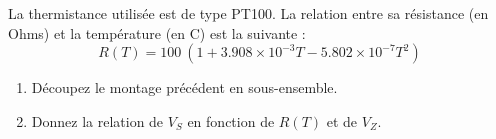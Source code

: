 La thermistance utilisée est de type PT100. La relation entre sa résistance (en Ohms) et la température (en \degre{}C) est la suivante :
$$R(T) = 100~(1 + 3.908×10^{-3} T - 5.802×10^{-7} T^2)$$


\begin{enumerate}
	\item Découpez le montage précédent en sous-ensemble.
	\item Donnez la relation de $V_S$ en fonction de $R(T)$ et de $V_Z$. 
\end{enumerate}





